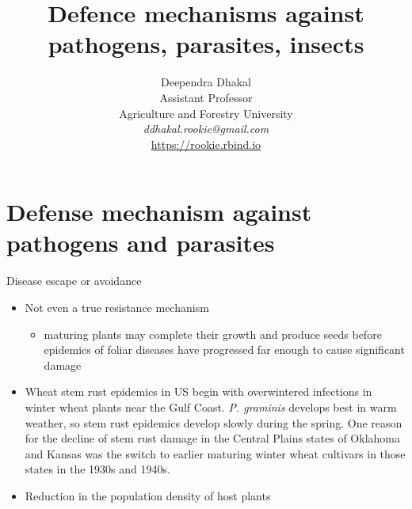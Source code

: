 \documentclass[11pt,dvipsnames,ignorenonframetext,aspectratio=169]{beamer}
\title[]{Defence mechanisms against pathogens, parasites, insects}
\author[
        \vspace{-0.5cm}Deependra Dhakal\\
Assistant Professor\\
Agriculture and Forestry University\\
\textit{ddhakal.rookie@gmail.com}\\
\url{https://rookie.rbind.io}
    ]{\vspace{-0.5cm}Deependra Dhakal\\
Assistant Professor\\
Agriculture and Forestry University\\
\textit{ddhakal.rookie@gmail.com}\\
\url{https://rookie.rbind.io}}
\date[
      
  ]{
    }
\providecommand{\tightlist}{%
  \setlength{\itemsep}{0pt}\setlength{\parskip}{0pt}}
\begin{document}
  \begin{frame}[plain]
  \titlepage
  \end{frame}



\hypertarget{defense-mechanism-against-pathogens-and-parasites}{%
\section{Defense mechanism against pathogens and
parasites}\label{defense-mechanism-against-pathogens-and-parasites}}

\begin{frame}{Disease escape or avoidance}
\protect\hypertarget{disease-escape-or-avoidance}{}
\begin{itemize}
\tightlist
\item
  Not even a true resistance mechanism

  \begin{itemize}
  \tightlist
  \item
    maturing plants may complete their growth and produce seeds before
    epidemics of foliar diseases have progressed far enough to cause
    significant damage
  \end{itemize}
\item
  Wheat stem rust epidemics in US begin with overwintered infections in
  winter wheat plants near the Gulf Coast. \textit{P. graminis} develops
  best in warm weather, so stem rust epidemics develop slowly during the
  spring. One reason for the decline of stem rust damage in the Central
  Plains states of Oklahoma and Kansas was the switch to earlier
  maturing winter wheat cultivars in those states in the 1930s and
  1940s.
\item
  Reduction in the population density of host plants
\end{itemize}
\end{frame}
\end{document}
